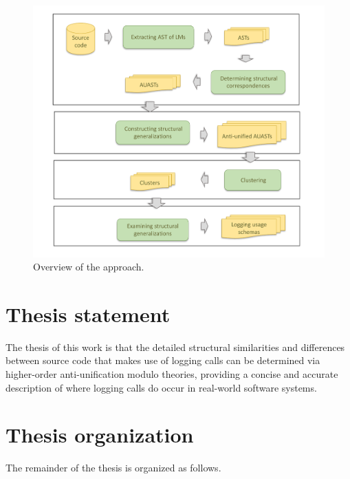 \begin{figure} [t]
  \centering\includegraphics [width = \textwidth]{Drawing4/SystemOverview.pdf}
  \caption{Overview of the approach. %
  }
  \label{fig:system_overview}
\end{figure}


\section{Thesis statement} \label{intro-stmt}
The thesis of this work is that the detailed structural similarities and differences between source code that makes use of logging calls can be determined via higher-order anti-unification modulo theories, providing a concise and accurate description of where logging calls do occur in real-world software systems.

\section{Thesis organization} \label{intro-org}
The remainder of the thesis is organized as follows.

